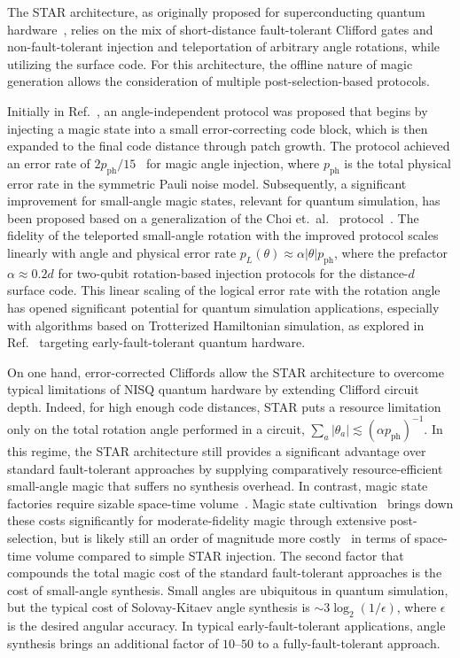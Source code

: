 \documentclass[aps, prx, reprint, superscriptaddress, longbibliography, floatfix]{revtex4-2}
\begin{document}
The STAR architecture, as originally proposed for superconducting quantum hardware~\cite{Akahoshi2024}, relies on the mix of short-distance fault-tolerant Clifford gates and non-fault-tolerant injection and teleportation of arbitrary angle rotations, while utilizing the surface code. For this architecture, the offline nature of magic generation allows the consideration of multiple post-selection-based protocols. 

Initially in Ref.~\cite{Akahoshi2024}, an angle-independent protocol was proposed that begins by injecting a magic state into a small error-correcting code block, which is then expanded to the final code distance through patch growth.
The protocol achieved an error rate of $2p_{\mathrm{ph}}/15$~\cite{Akahoshi2024} for magic angle injection, where $p_{\mathrm{ph}}$ is the total physical error rate in the symmetric Pauli noise model. Subsequently, a significant improvement for small-angle magic states, relevant for quantum simulation, has been proposed based on a generalization of the Choi et.~al.~\cite{Choi2023} protocol~\cite{Toshio2024}. The fidelity of the teleported small-angle rotation with the improved protocol scales linearly with angle and physical error rate $p_L(\theta)\approx \alpha |\theta|p_{\mathrm{ph}}$, where the prefactor $\alpha \approx 0.2d$ for two-qubit rotation-based injection protocols for the distance-$d$ surface code. This linear scaling of the logical error rate with the rotation angle has opened significant potential for quantum simulation applications, especially with algorithms based on Trotterized Hamiltonian simulation, as explored in Ref.~\cite{Akahoshi2024b, Toshio2024} targeting early-fault-tolerant quantum hardware. 

On one hand, error-corrected Cliffords allow the STAR architecture to overcome typical limitations of NISQ quantum hardware by extending Clifford circuit depth. Indeed, for high enough code distances, STAR puts a resource limitation only on the total rotation angle performed in a circuit, $\sum_a|\theta_a| \lesssim (\alpha p_{\mathrm{ph}})^{-1}$. In this regime, the STAR architecture still provides a significant advantage over standard fault-tolerant approaches by supplying comparatively resource-efficient small-angle magic that suffers no synthesis overhead. In contrast, magic state factories require sizable space-time volume~\cite{Campbell2017}. Magic state cultivation~\cite{Gidney2024} brings down these costs significantly for moderate-fidelity magic through extensive post-selection, but is likely still an order of magnitude more costly~\cite{Gidney2024, Chen2025} in terms of space-time volume compared to simple STAR injection. The second factor that compounds the total magic cost of the standard fault-tolerant approaches is the cost of small-angle synthesis. Small angles are ubiquitous in quantum simulation, but the typical cost of Solovay-Kitaev angle synthesis is $\sim 3\log_2 (1/\epsilon)$, where $\epsilon$ is the desired angular accuracy. In typical early-fault-tolerant applications, angle synthesis brings an additional factor of $10$--$50$ to a fully-fault-tolerant approach. 
\end{document}
